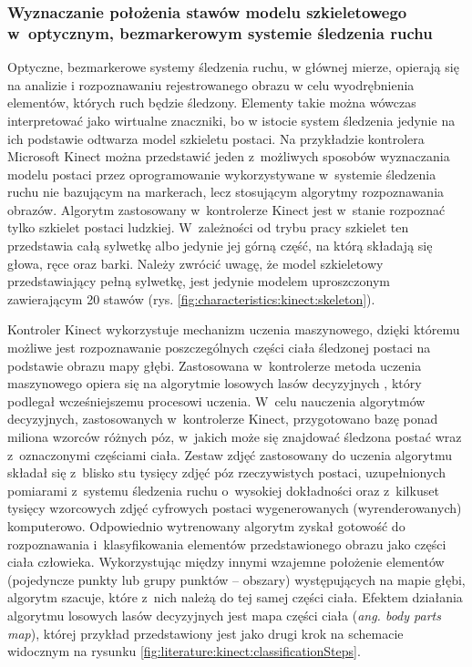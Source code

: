 \subsubsection*{Wyznaczanie położenia stawów modelu szkieletowego w~optycznym, bezmarkerowym systemie śledzenia ruchu}\label{chap:humanModel:kinect}
Optyczne, bezmarkerowe systemy śledzenia ruchu, w głównej mierze, opierają się na analizie i rozpoznawaniu rejestrowanego obrazu w celu wyodrębnienia elementów, których ruch będzie śledzony. Elementy takie można wówczas interpretować jako wirtualne znaczniki, bo w istocie system śledzenia jedynie na ich podstawie odtwarza model szkieletu postaci. Na przykładzie kontrolera Microsoft Kinect można przedstawić jeden z~możliwych sposobów wyznaczania modelu postaci przez oprogramowanie wykorzystywane w~systemie śledzenia ruchu nie bazującym na markerach, lecz stosującym algorytmy rozpoznawania obrazów. Algorytm zastosowany w~kontrolerze Kinect jest w~stanie rozpoznać tylko szkielet postaci ludzkiej. W~zależności od trybu pracy szkielet ten przedstawia całą sylwetkę albo jedynie jej górną część, na którą składają się głowa, ręce oraz barki. Należy zwrócić uwagę, że model szkieletowy przedstawiający pełną sylwetkę, jest jedynie modelem uproszczonym zawierającym 20 stawów (rys. \ref{fig:characteristics:kinect:skeleton}).
																							
Kontroler Kinect wykorzystuje mechanizm uczenia maszynowego, dzięki któremu możliwe jest rozpoznawanie poszczególnych części ciała śledzonej postaci na podstawie obrazu mapy głębi. Zastosowana w~kontrolerze metoda uczenia maszynowego opiera się na algorytmie losowych lasów decyzyjnych \cite{Criminisi2011}, który podlegał wcześniejszemu procesowi uczenia. W~celu nauczenia algorytmów decyzyjnych, zastosowanych w~kontrolerze Kinect, przygotowano bazę ponad miliona wzorców różnych póz, w~jakich może się znajdować śledzona postać wraz z~oznaczonymi częściami ciała. Zestaw zdjęć zastosowany do uczenia algorytmu składał się z~blisko stu tysięcy zdjęć póz rzeczywistych postaci, uzupełnionych pomiarami z~systemu śledzenia ruchu o~wysokiej dokładności oraz z~kilkuset tysięcy wzorcowych zdjęć cyfrowych postaci wygenerowanych (wyrenderowanych) komputerowo\cite{MacCormick2011}. Odpowiednio wytrenowany algorytm zyskał gotowość do rozpoznawania i~klasyfikowania elementów przedstawionego obrazu jako części ciała człowieka. Wykorzystując między innymi wzajemne położenie elementów (pojedyncze punkty lub grupy punktów -- obszary) występujących na mapie głębi, algorytm szacuje, które z~nich należą do tej samej części ciała. Efektem działania algorytmu losowych lasów decyzyjnych jest mapa części ciała (\emph{ang. body parts map}), której przykład przedstawiony jest jako drugi krok na schemacie widocznym na rysunku \ref{fig:literature:kinect:classificationSteps}.
																							
